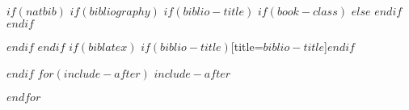 \documentclass[$if(fontsize)$$fontsize$,$endif$$if(lang)$$babel-lang$,$endif$$if(papersize)$$papersize$paper,$endif$$for(classoption)$$classoption$$sep$,$endfor$]{article}
\begin{document}

\newpage
\singlespacing 
$if(natbib)$
$if(bibliography)$
$if(biblio-title)$
$if(book-class)$
\renewcommand\bibname{$biblio-title$}
$else$
\renewcommand\refname{$biblio-title$}
$endif$
$endif$


$endif$
$endif$
$if(biblatex)$
\printbibliography$if(biblio-title)$[title=$biblio-title$]$endif$

$endif$
$for(include-after)$
$include-after$

$endfor$
\end{document}
